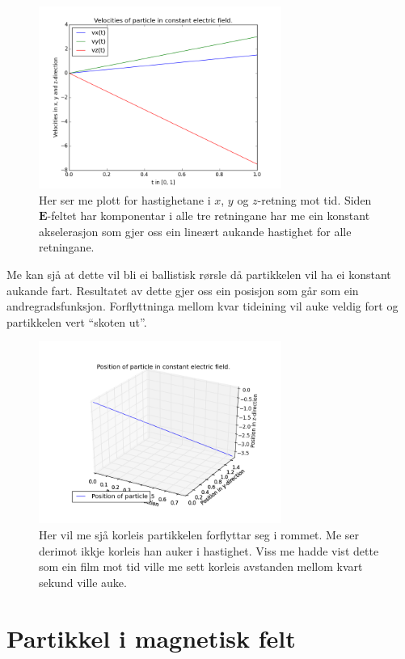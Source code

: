\documentclass[11pt, a4paper]{article}
\begin{document}
  \begin{figure}[H]
    \centering
    \includegraphics[width=300px]{C2.png}
    \caption{Her ser me plott for hastighetane i $x$, $y$ og $z$-retning mot tid. Siden $\mathbf{E}$-feltet har komponentar i alle tre retningane har me ein konstant akselerasjon 
    som gjer oss ein lineært aukande hastighet for alle retningane.}
  \end{figure}
  Me kan sjå at dette vil bli ei ballistisk rørsle då partikkelen vil ha ei konstant aukande fart. Resultatet av dette gjer oss ein posisjon som går som ein andregradsfunksjon.
  Forflyttninga mellom kvar tideining vil auke veldig fort og partikkelen vert ``skoten ut''.

  \begin{figure}[H]
    \centering
    \includegraphics[width=300px]{D.png}
    \caption{Her vil me sjå korleis partikkelen forflyttar seg i rommet. Me ser derimot ikkje korleis han auker i hastighet. Viss me hadde vist dette som ein film mot tid ville me 
    sett korleis avstanden mellom kvart sekund ville auke.}
  \end{figure}


\newpage
\section{Partikkel i magnetisk felt}
\end{document}
